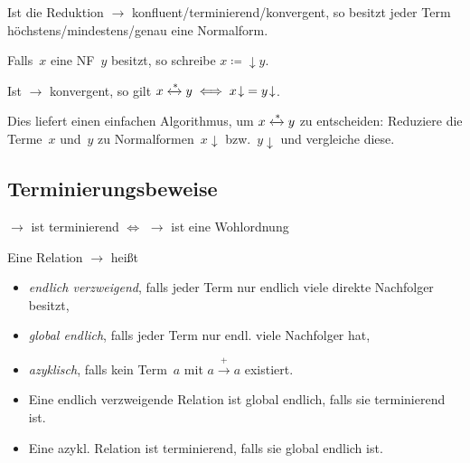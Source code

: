 \documentclass{cheat-sheet}
\newcommand{\strictlyReducesTo}{\xrightarrow{+}}
\newcommand{\zzEq}{\xleftrightarrow{*}} %
\newcommand{\NF}[1]{{{#1}\!\downarrow}} %
\begin{document}
\begin{lem}
  Ist die Reduktion ${\to}$ konfluent/terminierend/konvergent, so besitzt jeder Term höchstens/mindestens/genau eine Normalform.
\end{lem}

\begin{nota}
  Falls~$x$ eine NF~$y$ besitzt, so schreibe $x \NF \coloneqq y$.
\end{nota}

\begin{thm}
  Ist ${\to}$ konvergent, so gilt $x \zzEq y \iff \NF{x} = \NF{y}$.
\end{thm}

\begin{bem}
  Dies liefert einen einfachen Algorithmus, um $x \zzEq y$ zu entscheiden:
  Reduziere die Terme~$x$ und~$y$ zu Normalformen~$\NF{x}$ bzw.~$\NF{y}$ und vergleiche diese.
\end{bem}

\subsection{Terminierungsbeweise}

\begin{lem}
  ${\to}$ ist terminierend $\iff$ ${\to}$ ist eine Wohlordnung
\end{lem}

\begin{defn}
  Eine Relation ${\to}$ heißt
  \begin{itemize}
    \item \emph{endlich verzweigend}, falls jeder Term nur endlich viele direkte Nachfolger besitzt,
    \item \emph{global endlich}, falls jeder Term nur endl. viele Nachfolger hat,
    \item \emph{azyklisch}, falls kein Term~$a$ mit $a \strictlyReducesTo a$ existiert.
  \end{itemize}
\end{defn}

\begin{lem}
  \begin{itemize}
    \item Eine endlich verzweigende Relation ist global endlich, falls sie terminierend ist.
    \item Eine azykl. Relation ist terminierend, falls sie global endlich ist.
  \end{itemize}
\end{lem}
\end{document}
